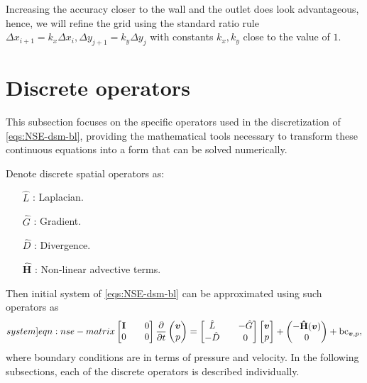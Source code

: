 \documentclass{article}
\numberwithin{equation}{section}
\begin{document}
Increasing the accuracy closer to the wall and the outlet does look advantageous, hence, we will refine the grid using the standard ratio rule $\Delta x_{i+1}=k_x\Delta x_i,\Delta y_{j+1}=k_y\Delta y_j$ with constants $k_x,k_y$ close to the value of $1$. 
	


\pagebreak
\section{Discrete operators}\label{sec:discrete-operators}

This subsection focuses on the specific operators used in the discretization of \cref{eqs:NSE-dsm-bl}, providing the mathematical tools necessary to transform these continuous equations into a form that can be solved numerically.

Denote discrete spatial operators as:
\begin{enumerate}
	\item[$\hat{L}$]:  Laplacian.
	\item[$\hat{G}$]: Gradient.
	\item[$\hat{D}$]: Divergence.
	\item[$\mathbf{\hat{H}}$]: Non-linear advective terms.
\end{enumerate}
Then initial system of \cref{eqs:NSE-dsm-bl} can be approximated using such operators as
\begin{equation}\label[system]{eqn:nse-matrix}
            \begin{bmatrix}
                  \mathbf{I} && 0 \\ 
                  0 && 0
            \end{bmatrix}
            \frac{\partial }{\partial t} 
            \begin{pmatrix}
                  \boldsymbol{v} \\ 
                  p
            \end{pmatrix}
            =
            \begin{bmatrix}
                  \hat{L} && - \hat{G} \\ 
                  -\hat{D} && 0
            \end{bmatrix}
            \begin{bmatrix}
                  \boldsymbol{v} \\
                  p
            \end{bmatrix}
            +
            \begin{pmatrix}
                  -\mathbf{\hat{H}}(\boldsymbol{v})\\
                  0
            \end{pmatrix} + \text{bc}_{\boldsymbol{v},p},
        \end{equation}
where boundary conditions are in terms of pressure and velocity. In the following subsections, each of the discrete operators is described individually. 
\end{document}
